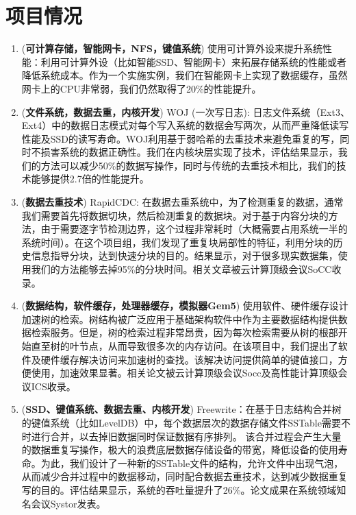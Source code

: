 \documentclass{article}
\begin{document}
\section{项目情况}
\begin{enumerate}
\item (\textbf{可计算存储，智能网卡，NFS，键值系统}) 使用可计算外设来提升系统性能：利用可计算外设（比如智能SSD、智能网卡）来拓展存储系统的性能或者降低系统成本。作为一个实施实例，我们在智能网卡上实现了数据缓存，虽然网卡上的CPU非常弱，我们仍然取得了20\%的性能提升。
\item (\textbf{文件系统，数据去重，内核开发}) WOJ (一次写日志): 日志文件系统（Ext3、Ext4）中的数据日志模式对每个写入系统的数据会写两次，从而严重降低读写性能及SSD的读写寿命。WOJ利用基于弱哈希的去重技术来避免重复的写，同时不损害系统的数据正确性。我们在内核块层实现了技术，评估结果显示，我们的方法可以减少50\%的数据写操作，同时与传统的去重技术相比，我们的技术能够提供2.7倍的性能提升。
\item (\textbf{数据去重技术}) RapidCDC:  在数据去重系统中，为了检测重复的数据，通常我们需要首先将数据切块，然后检测重复的数据块。对于基于内容分块的方法，由于需要逐字节检测边界，这个过程非常耗时（大概需要占用系统一半的系统时间）。在这个项目组，我们发现了重复块局部性的特征，利用分块的历史信息指导分块，达到快速分块的目的。结果显示，对于很多现实数据集，使用我们的方法能够去掉95\%的分块时间。相关文章被云计算顶级会议SoCC收录。
\item (\textbf{数据结构，软件缓存，处理器缓存，模拟器Gem5}) 使用软件、硬件缓存设计加速树的检索。树结构被广泛应用于基础架构软件中作为主要数据结构提供数据检索服务。但是，树的检索过程非常昂贵，因为每次检索需要从树的根部开始直至树的叶节点，从而导致很多次的内存访问。在该项目中，我们提出了软件及硬件缓存解决访问来加速树的查找。该解决访问提供简单的键值接口，方便使用，加速效果显著。相关论文被云计算顶级会议Socc及高性能计算顶级会议ICS收录。
\item (\textbf{SSD、键值系统、数据去重、内核开发}) Freewrite：在基于日志结构合并树的键值系统（比如LevelDB）中，每个数据层次的数据存储文件SSTable需要不时进行合并，以去掉旧数据同时保证数据有序排列。
该合并过程会产生大量的数据重复写操作，极大的浪费底层数据存储设备的带宽，降低设备的使用寿命。为此，我们设计了一种新的SSTable文件的结构，允许文件中出现气泡，从而减少合并过程中的数据移动，同时配合数据去重技术，达到减少数据重复写的目的。评估结果显示，系统的吞吐量提升了26\%。论文成果在系统领域知名会议Systor发表。
\end{enumerate}
\end{document}
